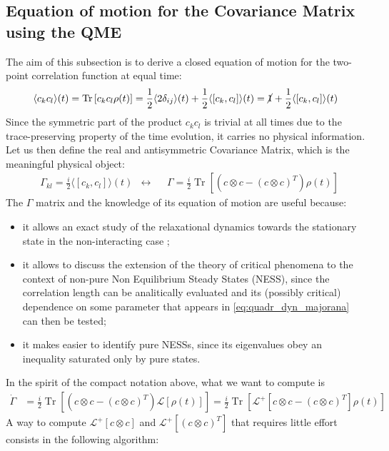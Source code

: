 \documentclass[a4paper,11pt]{article}
\DeclareMathOperator{\Tr}{Tr}
\theoremstyle{remark}
\newcommand{\mean}[1]{\ensuremath{\langle #1 \rangle}}
\newcommand{\ro}{\rho}
\newcommand{\nl}{\vskip 0.3cm}
\begin{document}
  \subsection{Equation of motion for the Covariance Matrix using the QME}
  The aim of this subsection is to derive a closed equation of motion for the two-point correlation function at equal time: \begin{equation*}
  \mean{c_kc_l}(t)=\Tr\left[c_kc_l\ro(t)\right]=\frac{1}{2}\mean{2\delta_{ij}}(t)+\frac{1}{2}\mean{[c_k,c_l]}(t)=\cancel{1}+\frac{1}{2}\mean{[c_k,c_l]}(t)
  \end{equation*}
  Since the symmetric part of the product $c_kc_l$ is trivial at all times due to the trace-preserving property of the time evolution, it carries no physical information. Let us then define the real and antisymmetric Covariance Matrix, which is the meaningful physical object:
  \begin{align}
   &\Gamma_{kl}=\frac{i}{2}\mean{\left[c_k,c_l\right]}(t) &  \longleftrightarrow & & \Gamma = \frac{i}{2}\Tr\left[\left(c\otimes c - (c\otimes c)^T\right)\ro(t)\right]
   \label{eq:def_covariance}
  \end{align}
  The $\Gamma$ matrix and the knowledge of its equation of motion are useful because:
  \begin{itemize}
   \item it allows an exact study of the relaxational dynamics towards the stationary state in the non-interacting case \cite{Eisert2010};
   \item it allows to discuss the extension of the theory of critical phenomena to the context of non-pure Non Equilibrium Steady States (NESS), since the correlation length can be analitically evaluated and its (possibly critical) dependence on some parameter that appears in \eqref{eq:quadr_dyn_majorana} can then be tested;
   \item it makes easier to identify pure NESSs, since its eigenvalues obey an inequality saturated only by pure states.\nl
  \end{itemize}
  In the spirit of the compact notation above, what we want to compute is
  \begin{align*}
   \dot{\Gamma} &=  \frac{i}{2}\Tr\left[\left(c\otimes c - (c\otimes c)^T\right)\mathcal{L}\left[\ro(t)\right]\right]=  \frac{i}{2}\Tr\left[\mathcal{L}^+\!\!\left[c\otimes c - (c\otimes c)^T\right]\ro(t)\right]
  \end{align*}
  A way to compute  $\mathcal{L}^+\!\!\left[c\otimes c\right]$ and $\mathcal{L}^+\!\!\left[ (c\otimes c)^T\right]$ that requires little effort consists in the following algorithm:
\end{document}
